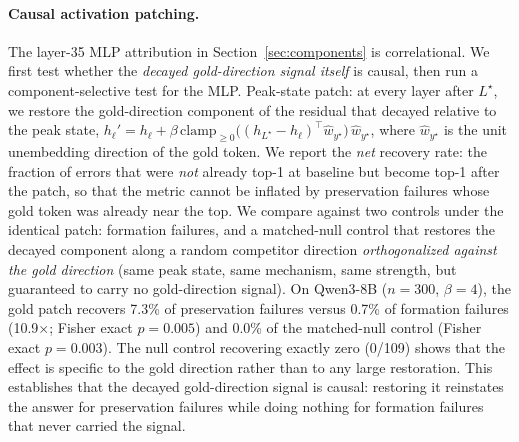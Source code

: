 \documentclass{article} %
\begin{document}
\paragraph{Causal activation patching.}
\label{sec:causal-patch}
The layer-35 MLP attribution in Section~\ref{sec:components} is correlational. We first test whether the \emph{decayed gold-direction signal itself} is causal, then run a component-selective test for the MLP. Peak-state patch: at every layer after $L^\star$, we restore the gold-direction component of the residual that decayed relative to the peak state, $h_\ell' = h_\ell + \beta\,\mathrm{clamp}_{\ge 0}\!\big((h_{L^\star}-h_\ell)^\top \hat{w}_{y^\star}\big)\,\hat{w}_{y^\star}$, where $\hat{w}_{y^\star}$ is the unit unembedding direction of the gold token. We report the \emph{net} recovery rate: the fraction of errors that were \emph{not} already top-1 at baseline but become top-1 after the patch, so that the metric cannot be inflated by preservation failures whose gold token was already near the top. We compare against two controls under the identical patch: formation failures, and a matched-null control that restores the decayed component along a random competitor direction \emph{orthogonalized against the gold direction} (same peak state, same mechanism, same strength, but guaranteed to carry no gold-direction signal). On Qwen3-8B ($n=300$, $\beta=4$), the gold patch recovers 7.3\% of preservation failures versus 0.7\% of formation failures (10.9$\times$; Fisher exact $p=0.005$) and 0.0\% of the matched-null control (Fisher exact $p=0.003$). The null control recovering exactly zero (0/109) shows that the effect is specific to the gold direction rather than to any large restoration. This establishes that the decayed gold-direction signal is causal: restoring it reinstates the answer for preservation failures while doing nothing for formation failures that never carried the signal.
\end{document}
